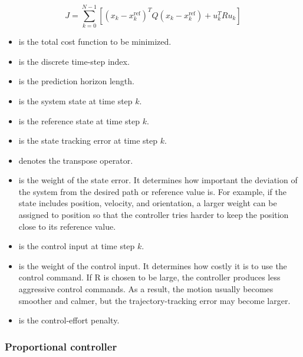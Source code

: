\documentclass{book}
\begin{document}
        \[
            J =
            \sum_{k=0}^{N-1}
            \left[
                \left( x_k - x_k^{\mathrm{ref}} \right)^{T}
                Q
                \left( x_k - x_k^{\mathrm{ref}} \right)
                +
                u_k^{T} R u_k
            \right]
        \]
        
        \begin{itemize}
            \item[$J$] is the total cost function to be minimized.
            \item[$k$] is the discrete time-step index.
            \item[$N$] is the prediction horizon length.
            \item[$x_k$] is the system state at time step $k$.
            \item[$x_k^{\mathrm{ref}}$] is the reference state at time step $k$.
            \item[$x_k - x_k^{\mathrm{ref}}$] is the state tracking error at time step $k$.
            \item[$(\cdot)^T$] denotes the transpose operator.
            \item[$Q$] is the weight of the state error. It determines how important the deviation of the system from the desired path or reference value is. For example, if the state includes position, velocity, and orientation, a larger weight can be assigned to position so that the controller tries harder to keep the position close to its reference value.
            \item[$u_k$] is the control input at time step $k$.
            \item[$R$] is the weight of the control input. It determines how costly it is to use the control command. If R is chosen to be large, the controller produces less aggressive control commands. As a result, the motion usually becomes smoother and calmer, but the trajectory-tracking error may become larger.
            \item[$u_k^T R u_k$] is the control-effort penalty.
        \end{itemize}

\subsubsection{Proportional controller}

\end{document}
